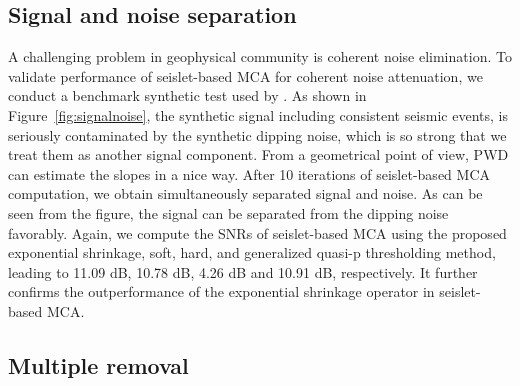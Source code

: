 \subsection{Signal and noise separation}

A challenging problem in geophysical community is coherent noise elimination. To validate performance of seislet-based MCA for coherent noise attenuation, we conduct a benchmark synthetic test used by \cite{fomel2002applications}. As shown in Figure~\ref{fig:signalnoise}, the synthetic signal including consistent seismic events, is seriously contaminated by the synthetic dipping noise, which is so strong that we treat them as another signal component. From a geometrical point of view, PWD can estimate the slopes in a nice way. After 10 iterations of  seislet-based MCA computation, we obtain simultaneously separated signal and noise. As can be seen from the figure, the signal can be separated from the dipping noise favorably. Again, we compute the SNRs of seislet-based MCA using the proposed exponential shrinkage, soft, hard, and generalized quasi-p thresholding method, leading to 11.09 dB, 10.78 dB, 4.26 dB and 10.91 dB, respectively. It further confirms the outperformance of the exponential shrinkage operator in seislet-based MCA.



  

\subsection{Multiple removal}


